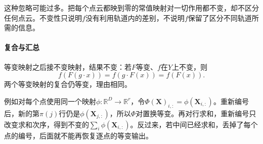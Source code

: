 这种忽略可能过多。把每个点云都映到零的常值映射对一切作用都不变，却不区分任何点云。不变性只说明$f$没有利用轨道内的差别，不说明$f$保留了区分不同轨道所需的信息。

\paragraph{复合与汇总}
等变映射之后接不变映射，结果不变：若$F$等变、$f$在$Y$上不变，则
\[
f(F(g\cdot x))=f(g\cdot F(x))=f(F(x)).
\]
两个等变映射的复合仍等变，理由相同。

例如对每个点使用同一个映射$\phi:\mathbb R^D\to\mathbb R^r$，令$\Phi(\bm X)_{i,:}=\phi(\bm X_{i,:})$。重新编号后，新的第$\pi(j)$行仍是$\phi(\bm X_{j,:})$，所以$\Phi$对置换等变。再对行求和，重新编号只改变求和次序，得到不变的$\sum_i\phi(\bm X_{i,:})$。反过来，若中间已经求和，丢掉了每个点的编号，后面就不能再恢复逐点的等变输出。

